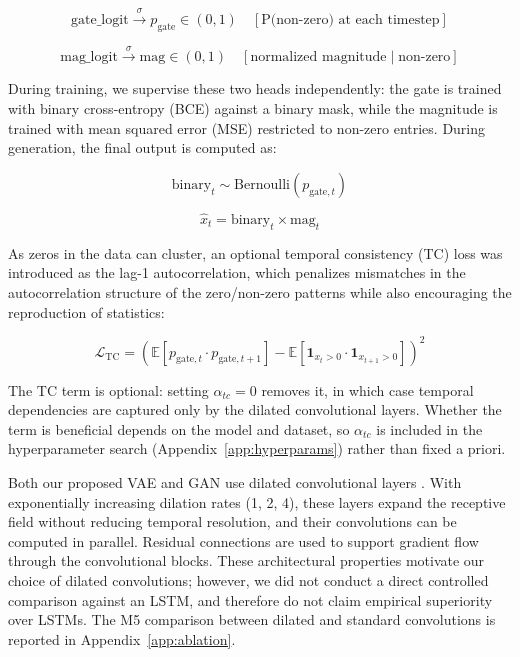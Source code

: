 \documentclass[make,article,submit,moreauthors]{Definitions/mdpi}
\begin{document}
\begin{equation}
    \text{gate\_logit} \xrightarrow{\sigma} p_{\text{gate}} \in (0,1) \quad [\text{P(non-zero) at each timestep}] 
\end{equation}

\begin{equation}
    \text{mag\_logit} \xrightarrow{\sigma} \text{mag} \in (0,1) \quad [\text{normalized magnitude} \mid \text{non-zero}]
\end{equation}

During training, we supervise these two heads independently: the gate is trained with binary cross-entropy (BCE) against a binary mask, while the magnitude is trained with mean squared error (MSE) restricted to non-zero entries. During generation, the final output is computed as:

\begin{equation}
    \text{binary}_t \sim \text{Bernoulli}(p_{\text{gate},t})
\end{equation}

\begin{equation}
    \hat{x}_t = \text{binary}_t \times \text{mag}_t
\end{equation}

As zeros in the data can cluster, an optional temporal consistency (TC) loss was introduced as the lag-1 autocorrelation, which penalizes mismatches in the autocorrelation structure of the zero/non-zero patterns while also encouraging the reproduction of statistics:

\begin{equation}
  \mathcal{L}_{\text{TC}} = \left( \mathbb{E}[p_{\text{gate},t} \cdot p_{\text{gate},t+1}] - \mathbb{E}[\mathbf{1}_{x_t>0} \cdot \mathbf{1}_{x_{t+1}>0}] \right)^2
\end{equation}

The TC term is optional: setting $\alpha_{tc}=0$ removes it, in which case temporal dependencies are captured only by the dilated convolutional layers. Whether the term is beneficial depends on the model and dataset, so $\alpha_{tc}$ is included in the hyperparameter search (Appendix~\ref{app:hyperparams}) rather than fixed a priori.


Both our proposed VAE and GAN use dilated convolutional layers \cite{ref31}. With exponentially increasing dilation rates (1, 2, 4), these layers expand the receptive field without reducing temporal resolution, and their convolutions can be computed in parallel. Residual connections are used to support gradient flow through the convolutional blocks. These architectural properties motivate our choice of dilated convolutions; however, we did not conduct a direct controlled comparison against an LSTM, and therefore do not claim empirical superiority over LSTMs. The M5 comparison between dilated and standard convolutions is reported in Appendix~\ref{app:ablation}.
\end{document}
